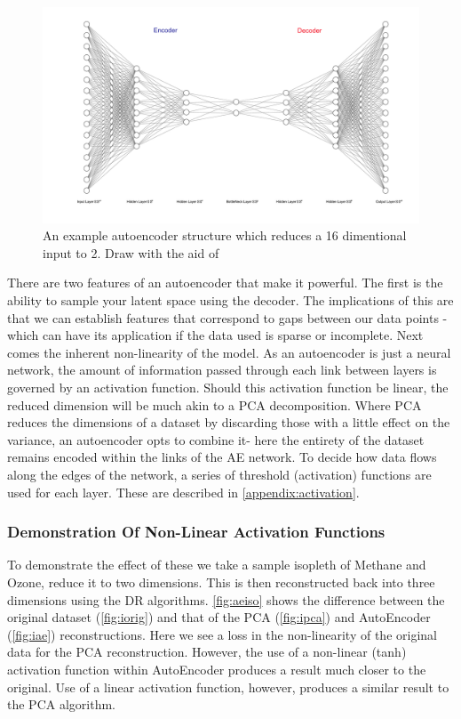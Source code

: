 \begin{figure}[H]
\includegraphics[width=\textwidth]{4fig/ae.pdf}
\caption{An example autoencoder structure which reduces a 16 dimentional input to 2. Draw with the aid of \citep{drawae}}
\end{figure}



There are two features of an autoencoder that make it powerful. The first is the ability to sample your latent space using the decoder. The implications of this are that we can establish features that correspond to gaps between our data points - which can have its application if the data used is sparse or incomplete. Next comes the inherent non-linearity of the model. As an autoencoder is just a neural network, the amount of information passed through each link between layers is governed by an activation function. Should this activation function be linear, the reduced dimension will be much akin to a PCA decomposition. Where PCA reduces the dimensions of a dataset by discarding those with a little effect on the variance, an autoencoder opts to combine it- here the entirety of the dataset remains encoded within the links of the AE network. To decide how data flows along the edges of the network, a series of threshold (activation) functions are used for each layer. These are described in \autoref{appendix:activation}.



\subsubsection{Demonstration Of Non-Linear Activation Functions}

To demonstrate the effect of these we take a sample isopleth of Methane and Ozone, reduce it to two dimensions. This is then reconstructed back into three dimensions using the DR algorithms.
\autoref{fig:aeiso} shows the difference between the original dataset (\autoref{fig:iorig}) and that of the PCA (\autoref{fig:ipca}) and AutoEncoder (\autoref{fig:iae}) reconstructions. Here we see a loss in the non-linearity of the original data for the PCA reconstruction. However, the use of a non-linear (tanh) activation function within AutoEncoder produces a result much closer to the original. Use of a linear activation function, however, produces a similar result to the PCA algorithm.

